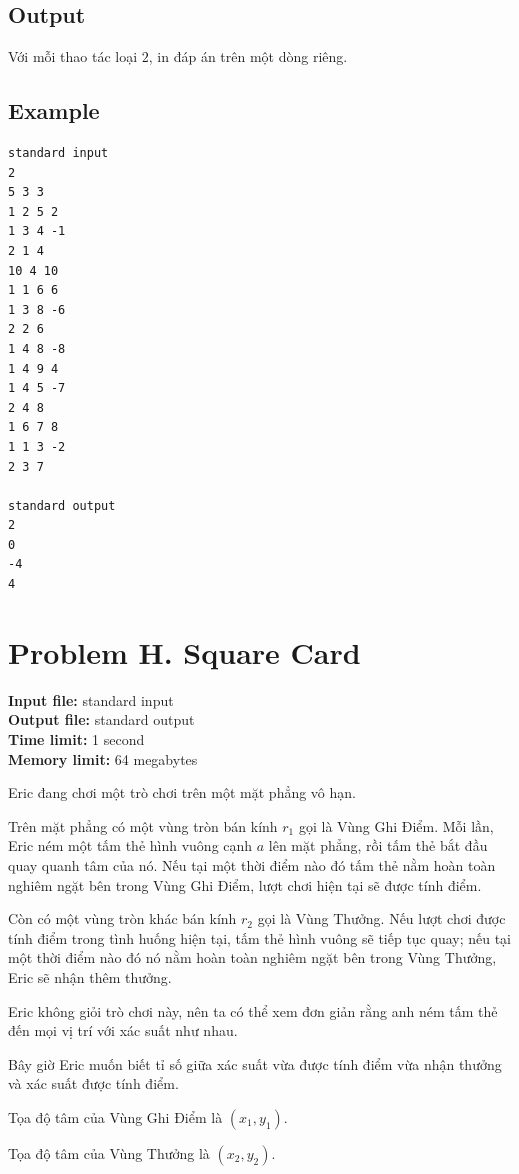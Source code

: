 \documentclass[11pt]{article}
\begin{document}
\subsection*{Output}

Với mỗi thao tác loại $2$, in đáp án trên một dòng riêng.

\subsection*{Example}

\begin{verbatim}
standard input
2
5 3 3
1 2 5 2
1 3 4 -1
2 1 4
10 4 10
1 1 6 6
1 3 8 -6
2 2 6
1 4 8 -8
1 4 9 4
1 4 5 -7
2 4 8
1 6 7 8
1 1 3 -2
2 3 7

standard output
2
0
-4
4
\end{verbatim}

\section{Problem H. Square Card}

\noindent
\textbf{Input file:} standard input\\
\textbf{Output file:} standard output\\
\textbf{Time limit:} 1 second\\
\textbf{Memory limit:} 64 megabytes

Eric đang chơi một trò chơi trên một mặt phẳng vô hạn.

Trên mặt phẳng có một vùng tròn bán kính $r_1$ gọi là Vùng Ghi Điểm. Mỗi lần,
Eric ném một tấm thẻ hình vuông cạnh $a$ lên mặt phẳng, rồi tấm thẻ bắt đầu
quay quanh tâm của nó. Nếu tại một thời điểm nào đó tấm thẻ nằm hoàn toàn
nghiêm ngặt bên trong Vùng Ghi Điểm, lượt chơi hiện tại sẽ được tính điểm.

Còn có một vùng tròn khác bán kính $r_2$ gọi là Vùng Thưởng. Nếu lượt chơi
được tính điểm trong tình huống hiện tại, tấm thẻ hình vuông sẽ tiếp tục quay;
nếu tại một thời điểm nào đó nó nằm hoàn toàn nghiêm ngặt bên trong Vùng
Thưởng, Eric sẽ nhận thêm thưởng.

Eric không giỏi trò chơi này, nên ta có thể xem đơn giản rằng anh ném tấm thẻ
đến mọi vị trí với xác suất như nhau.

Bây giờ Eric muốn biết tỉ số giữa xác suất vừa được tính điểm vừa nhận thưởng
và xác suất được tính điểm.

Tọa độ tâm của Vùng Ghi Điểm là $(x_1,y_1)$.

Tọa độ tâm của Vùng Thưởng là $(x_2,y_2)$.
\end{document}
